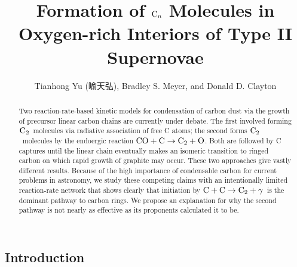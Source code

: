 \documentclass[manuscript]{aastex}
\newcommand{\ctwo}{{\rm C}_2}
\newcommand{\cenn}{{\rm C}_n}
\newcommand{\twoctoctwo}{${\rm C} + {\rm C} \to \ctwo + \gamma$}
\newcommand{\coctoctwo}{${\rm CO} + {\rm C} \to \ctwo + {\rm O}$}
\begin{document}
\begin{CJK*}{UTF8}{gbsn}

\title{Formation of $\cenn$ Molecules in Oxygen-rich Interiors of Type II
Supernovae}

\author{Tianhong Yu (喻天弘), Bradley S. Meyer, and Donald D. Clayton}

\begin{abstract}
Two reaction-rate-based kinetic models for condensation of carbon dust via the
growth of precursor linear carbon chains are currently under debate. The first
involved forming $\ctwo$\ molecules via radiative association of free C
atoms; the second forms $\ctwo$\ molecules by the endoergic reaction
\coctoctwo. Both are
followed by C captures until the linear chain eventually makes an isomeric
transition to ringed carbon on which rapid growth of graphite may occur.
These two approaches give vastly different results. Because of the high
importance of condensable carbon for current problems in astronomy,
we study these competing claims with an intentionally limited reaction-rate
network that shows clearly that initiation by
\twoctoctwo\ is the dominant
pathway to carbon rings. We propose an explanation for why the second pathway
is not nearly as effective as its proponents calculated it to be.
\end{abstract}


\section{Introduction}


\end{CJK*}
\end{document}
